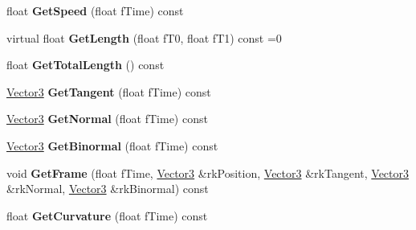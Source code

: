 \begin{DoxyCompactItemize}
\item 
float {\bfseries Get\+Speed} (float f\+Time) const \hypertarget{class_i_dream_sky_1_1_curve3_a201791ca665f92cd98daa826b791fc1c}{}\label{class_i_dream_sky_1_1_curve3_a201791ca665f92cd98daa826b791fc1c}

\item 
virtual float {\bfseries Get\+Length} (float f\+T0, float f\+T1) const  =0\hypertarget{class_i_dream_sky_1_1_curve3_a3acc1689675590e3aa86c1fde4f1ed1f}{}\label{class_i_dream_sky_1_1_curve3_a3acc1689675590e3aa86c1fde4f1ed1f}

\item 
float {\bfseries Get\+Total\+Length} () const \hypertarget{class_i_dream_sky_1_1_curve3_a584629be8ad898d9737d042936684a07}{}\label{class_i_dream_sky_1_1_curve3_a584629be8ad898d9737d042936684a07}

\item 
\hyperlink{class_i_dream_sky_1_1_vector3}{Vector3} {\bfseries Get\+Tangent} (float f\+Time) const \hypertarget{class_i_dream_sky_1_1_curve3_a1d7f6587eeb510590fcfeaffdc073ceb}{}\label{class_i_dream_sky_1_1_curve3_a1d7f6587eeb510590fcfeaffdc073ceb}

\item 
\hyperlink{class_i_dream_sky_1_1_vector3}{Vector3} {\bfseries Get\+Normal} (float f\+Time) const \hypertarget{class_i_dream_sky_1_1_curve3_a059caeaab359d5334846d963f2912e27}{}\label{class_i_dream_sky_1_1_curve3_a059caeaab359d5334846d963f2912e27}

\item 
\hyperlink{class_i_dream_sky_1_1_vector3}{Vector3} {\bfseries Get\+Binormal} (float f\+Time) const \hypertarget{class_i_dream_sky_1_1_curve3_aec46bf21000703f93d0c51b3c2cdd2ba}{}\label{class_i_dream_sky_1_1_curve3_aec46bf21000703f93d0c51b3c2cdd2ba}

\item 
void {\bfseries Get\+Frame} (float f\+Time, \hyperlink{class_i_dream_sky_1_1_vector3}{Vector3} \&rk\+Position, \hyperlink{class_i_dream_sky_1_1_vector3}{Vector3} \&rk\+Tangent, \hyperlink{class_i_dream_sky_1_1_vector3}{Vector3} \&rk\+Normal, \hyperlink{class_i_dream_sky_1_1_vector3}{Vector3} \&rk\+Binormal) const \hypertarget{class_i_dream_sky_1_1_curve3_a754cffa0febd7de58c9e6f626e54e350}{}\label{class_i_dream_sky_1_1_curve3_a754cffa0febd7de58c9e6f626e54e350}

\item 
float {\bfseries Get\+Curvature} (float f\+Time) const \hypertarget{class_i_dream_sky_1_1_curve3_a610ca8db1de4801fe3734f8fc54cd54e}{}\label{class_i_dream_sky_1_1_curve3_a610ca8db1de4801fe3734f8fc54cd54e}


\end{DoxyCompactItemize}
